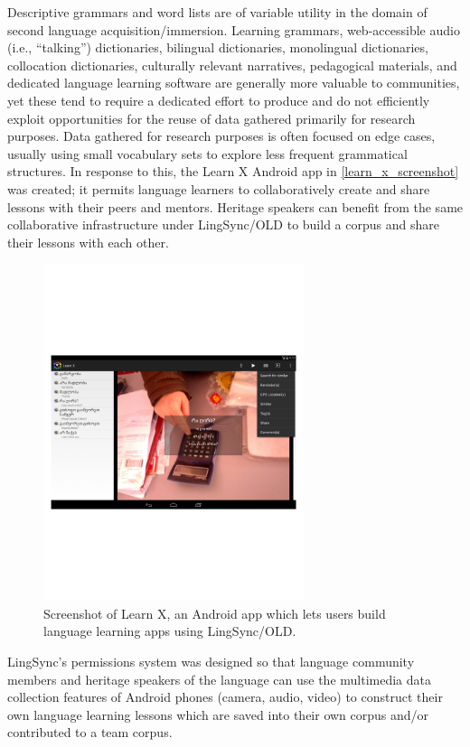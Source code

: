 \documentclass[11pt]{article}
\begin{document}
Descriptive grammars and word lists are of variable utility in the domain of second language acquisition/immersion.
Learning grammars, web-accessible audio (i.e., ``talking'') dictionaries, bilingual dictionaries, monolingual dictionaries, collocation dictionaries, culturally relevant narratives, pedagogical materials, and dedicated language
learning software are generally more valuable to communities, yet these tend to
require a dedicated effort to produce and do not efficiently exploit
opportunities for the reuse of data gathered primarily for research purposes. 
Data gathered for research purposes is often focused on edge cases, usually
using small vocabulary sets to explore less frequent grammatical structures.
In response to this, the Learn X Android app in \autoref{learn_x_screenshot}
was created; it permits language learners to collaboratively create and share
lessons with their peers and mentors. Heritage speakers can benefit from the
same collaborative infrastructure under LingSync/OLD to build a corpus and share
their lessons with each other. 

\begin{figure}
\begin{center}
\includegraphics[width=3in]{images/learnX}
\caption{Screenshot of Learn X, an Android app which lets users build language
learning apps using LingSync/OLD.}
\label{learn_x_screenshot}
\end{center}
\end{figure}

LingSync's permissions system was designed so that language community members
and heritage speakers of the language can use the multimedia data collection
features of Android phones (camera, audio, video) to construct their own
language learning lessons which are saved into their own corpus and/or
contributed to a team corpus.
\end{document}
